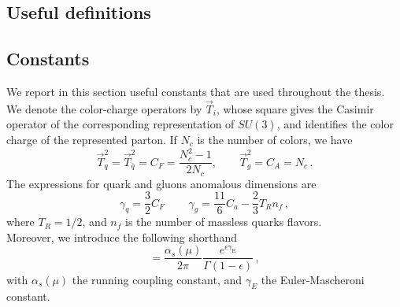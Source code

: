 \documentclass[a4paper, 12pt]{book}
\begin{document}
\begin{appendices}
\pagestyle{append}

\chapter{Useful definitions}

\section{Constants}
We report in this section useful constants that are used throughout the thesis. We denote the color-charge operators by $\vec{T}_i$, whose square gives the Casimir operator of the corresponding representation of $SU(3)$, and identifies the color charge of the represented parton. If $N_c$ is the number of colors, we have
\begin{equation}
  \vec{T}_q^2 = \vec{T}_{\bar{q}}^2 = C_F = \frac{N^2_c -1}{2N_c} , \qquad \vec{T}_g^2=C_A= N_c \, .
  \label{casimir-operators}
\end{equation}
The expressions for quark and gluons anomalous dimensions are 
\begin{equation}
  \gamma_q = \frac{3}{2}C_F \, \qquad \gamma_g = \frac{11}{6}C_a - \frac{2}{3}T_R n_f \, ,
  \label{anomalous-dimension}
\end{equation}
where $T_R=1/2$, and $n_f$ is the number of massless quarks flavors. \\
Moreover, we introduce the following shorthand
\begin{equation}
  [\alpha_s] = \frac{\alpha_s(\mu)}{2\pi} \frac{e^{\epsilon \gamma_{\mathrm{E}}}}{\Gamma(1-\epsilon)} \, ,
  \label{coupling}
\end{equation}
with $\alpha_s(\mu)$ the running coupling constant, and $\gamma_E$ the Euler-Mascheroni constant.


\end{appendices}
\end{document}
